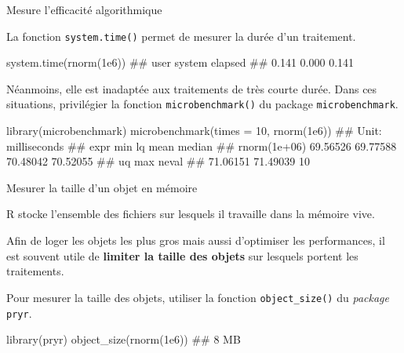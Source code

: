 \documentclass[12pt,ignorenonframetext,]{beamer}
\newenvironment{Shaded}{}{}
\newcommand{\KeywordTok}[1]{\textcolor[rgb]{0.00,0.00,1.00}{#1}}
\newcommand{\DataTypeTok}[1]{#1}
\newcommand{\DecValTok}[1]{#1}
\newcommand{\FloatTok}[1]{#1}
\newcommand{\NormalTok}[1]{#1}
\renewenvironment{Shaded}{\begin{snugshade}}{\end{snugshade}}
\begin{document}
\begin{frame}[fragile]{Mesure l'efficacité algorithmique}

La fonction \texttt{system.time()} permet de mesurer la durée d'un
traitement.

\footnotesize

\begin{Shaded}
\begin{Highlighting}[]
\KeywordTok{system.time}\NormalTok{(}\KeywordTok{rnorm}\NormalTok{(}\FloatTok{1e6}\NormalTok{))}
\NormalTok{  ##    user  system elapsed }
\NormalTok{  ##   0.141   0.000   0.141}
\end{Highlighting}
\end{Shaded}

\pause \normalsize
Néanmoins, elle est inadaptée aux traitements de très courte durée. Dans
ces situations, privilégier la fonction \texttt{microbenchmark()} du
package \texttt{microbenchmark}.

\footnotesize

\begin{Shaded}
\begin{Highlighting}[]
\KeywordTok{library}\NormalTok{(microbenchmark)}
\KeywordTok{microbenchmark}\NormalTok{(}\DataTypeTok{times =} \DecValTok{10}\NormalTok{, }\KeywordTok{rnorm}\NormalTok{(}\FloatTok{1e6}\NormalTok{))}
\NormalTok{  ## Unit: milliseconds}
\NormalTok{  ##          expr      min       lq     mean   median}
\NormalTok{  ##  rnorm(1e+06) 69.56526 69.77588 70.48042 70.52055}
\NormalTok{  ##        uq      max neval}
\NormalTok{  ##  71.06151 71.49039    10}
\end{Highlighting}
\end{Shaded}

\end{frame}

\begin{frame}[fragile]{Mesurer la taille d'un objet en mémoire}

R stocke l'ensemble des fichiers sur lesquels il travaille dans la
mémoire vive.

Afin de loger les objets les plus gros mais aussi d'optimiser les
performances, il est souvent utile de \textbf{limiter la taille des
objets} sur lesquels portent les traitements.

\pause Pour mesurer la taille des objets, utiliser la fonction
\texttt{object\_size()} du \emph{package} \texttt{pryr}.

\begin{Shaded}
\begin{Highlighting}[]
\KeywordTok{library}\NormalTok{(pryr)}
\KeywordTok{object_size}\NormalTok{(}\KeywordTok{rnorm}\NormalTok{(}\FloatTok{1e6}\NormalTok{))}
\NormalTok{  ## 8 MB}
\end{Highlighting}
\end{Shaded}

\end{frame}
\end{document}
